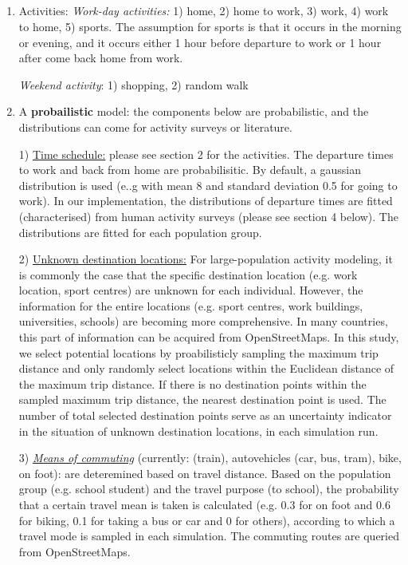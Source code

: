 \documentclass[]{article}
\begin{document}
\subsection{}
\begin{enumerate}
\def\labelenumi{\arabic{enumi}.}
\item
  Activities:
  \emph{Work-day activities:} 1) home, 2) home to work, 3) work, 4) work
  to home, 5) sports. The assumption for sports is that it occurs in the
  morning or evening, and it occurs either 1 hour before departure to
  work or 1 hour after come back home from work.

  \emph{Weekend activity}: 1) shopping, 2) random walk 
\item
  A \textbf{probailistic} model: the components below are probabilistic,
  and the distributions can come for activity surveys or literature.

  1) \underline{Time schedule:} please see section 2 for the activities.
  The departure times to work and back from home are probabilisitic. By
  default, a gaussian distribution is used (e..g with mean 8 and
  standard deviation 0.5 for going to work). In our implementation, the
  distributions of departure times are fitted (characterised) from human
  activity surveys (please see section 4 below). The distributions are
  fitted for each population group.

  2) \underline{Unknown destination locations:} For large-population
  activity modeling, it is commonly the case that the specific
  destination location (e.g. work location, sport centres) are unknown
  for each individual. However, the information for the entire locations
  (e.g. sport centres, work buildings, universities, schools) are
  becoming more comprehensive. In many countries, this part of
  information can be acquired from OpenStreetMaps. In this study, we
  select potential locations by proabilisticly sampling the maximum trip
  distance and only randomly select locations within the Euclidean
  distance of the maximum trip distance. If there is no destination
  points within the sampled maximum trip distance, the nearest
  destination point is used. The number of total selected destination
  points serve as an uncertainty indicator in the situation of unknown
  destination locations, in each simulation run.

  3) \emph{\underline{Means of commuting}} (currently: (train),
  autovehicles (car, bus, tram), bike, on foot): are deteremined based
  on travel distance. Based on the population group (e.g. school
  student) and the travel purpose (to school), the probability that a
  certain travel mean is taken is calculated (e.g. 0.3 for on foot and
  0.6 for biking, 0.1 for taking a bus or car and 0 for others),
  according to which a travel mode is sampled in each simulation. The
  commuting routes are queried from OpenStreetMaps.


\end{enumerate}
\end{document}
